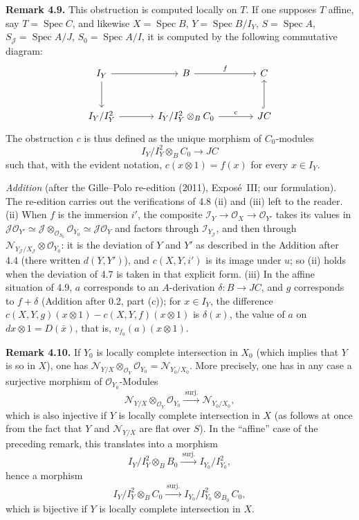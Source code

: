 \medskip
\noindent{}\textbf{Remark 4.9.}
This obstruction is computed locally on \(T\). If one supposes \(T\) affine,
say \(T=\operatorname{Spec}C\), and likewise \(X=\operatorname{Spec}B\),
\(Y=\operatorname{Spec}B/I_Y\), \(S=\operatorname{Spec}A\),
\(S_{\mathscr J}=\operatorname{Spec}A/J\), \(S_0=\operatorname{Spec}A/I\), it is
computed by the following commutative diagram:
\[
\begin{tikzcd}[column sep=large,row sep=large]
 I_Y\arrow[r]\arrow[d]&B\arrow[r,"f"]&C\\
 I_Y/I_Y^2\arrow[r]&I_Y/I_Y^2\otimes_BC_0\arrow[r,"c"]&JC\arrow[u,hook]
\end{tikzcd}
\]
The obstruction \(c\) is thus defined as the unique morphism of
\(C_0\)-modules
\[
 I_Y/I_Y^2\otimes_BC_0\longrightarrow JC
\]
such that, with the evident notation, \(c(x\otimes1)=f(x)\) for every
\(x\in I_Y\).

\emph{Addition} (after the Gille--Polo re-edition (2011), Exposé~III; our
formulation). The re-edition carries out the verifications of 4.8 (ii) and
(iii) left to the reader. (ii) When \(f\) is the immersion \(i'\), the
composite \(\mathscr I_Y\to\mathscr O_X\to\mathscr O_{Y'}\) takes its values in
\(\mathscr J\mathscr O_{Y'}\simeq\mathscr J\otimes_{\mathscr O_{S_0}}
\mathscr O_{Y_0}\simeq\mathscr J\mathscr O_Y\) and factors through
\(\mathscr I_{Y_{\mathscr J}}\), and then through
\(\mathscr N_{Y_{\mathscr J}/X_{\mathscr J}}\otimes\mathscr O_{Y_0}\): it is the
deviation of \(Y\) and \(Y'\) as described in the Addition after 4.4 (there
written \(d(Y,Y')\)), and \(c(X,Y,i')\) is its image under \(u\); so (ii) holds
when the deviation of 4.7 is taken in that explicit form. (iii) In the affine
situation of 4.9, \(a\) corresponds to an \(A\)-derivation \(\delta\colon B\to
JC\), and \(g\) corresponds to \(f+\delta\) (Addition after 0.2, part (c)); for
\(x\in I_Y\), the difference \(c(X,Y,g)(x\otimes1)-c(X,Y,f)(x\otimes1)\) is
\(\delta(x)\), the value of \(a\) on \(dx\otimes1=D(\bar x)\), that is,
\(v_{f_0}(a)(x\otimes1)\).

\medskip
\noindent{}\textbf{Remark 4.10.}
If \(Y_0\) is locally complete intersection in \(X_0\) (which implies that
\(Y\) is so in \(X\)), one has
\(\mathscr N_{Y/X}\otimes_{\mathscr O_Y}\mathscr O_{Y_0}=\mathscr N_{Y_0/X_0}\).
More precisely, one has in any case a surjective morphism of
\(\mathscr O_{Y_0}\)-Modules
\[
 \mathscr N_{Y/X}\otimes_{\mathscr O_Y}\mathscr O_{Y_0}
 \xrightarrow{\ \mathrm{surj.}\ }\mathscr N_{Y_0/X_0},
\]
which is also injective if \(Y\) is locally complete intersection in \(X\) (as
follows at once from the fact that \(Y\) and \(\mathscr N_{Y/X}\) are flat over
\(S\)). In the ``affine'' case of the preceding remark, this translates into a
morphism
\[
 I_Y/I_Y^2\otimes_BB_0\xrightarrow{\ \mathrm{surj.}\ }I_{Y_0}/I_{Y_0}^2,
\]
hence a morphism
\[
 I_Y/I_Y^2\otimes_BC_0\xrightarrow{\ \mathrm{surj.}\ }
 I_{Y_0}/I_{Y_0}^2\otimes_{B_0}C_0,
\]
which is bijective if \(Y\) is locally complete intersection in \(X\).

